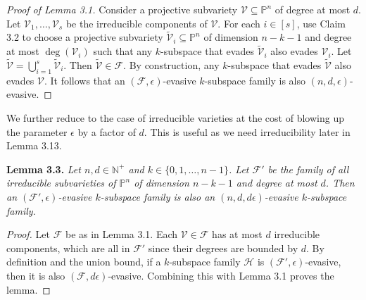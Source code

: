 \documentclass[10pt,a4paper]{article}
\newcommand{\PP}{\mathbb P}
\newenvironment{result}[1]{\par\medskip\noindent\textbf{#1.}\itshape}{\par\medskip}
\begin{document}
\begin{proof}[Proof of Lemma 3.1]
Consider a projective subvariety $\mathcal V\subseteq\PP^n$ of degree at most $d$. Let $\mathcal V_1,\ldots,\mathcal V_s$ be the irreducible components of $\mathcal V$. For each $i\in[s]$, use Claim 3.2 to choose a projective subvariety $\widetilde{\mathcal V}_i\subseteq\PP^n$ of dimension $n-k-1$ and degree at most $\deg(\mathcal V_i)$ such that any $k$-subspace that evades $\widetilde{\mathcal V}_i$ also evades $\mathcal V_i$. Let $\widetilde{\mathcal V}=\bigcup_{i=1}^s\widetilde{\mathcal V}_i$. Then $\widetilde{\mathcal V}\in\mathcal F$. By construction, any $k$-subspace that evades $\widetilde{\mathcal V}$ also evades $\mathcal V$. It follows that an $(\mathcal F,\epsilon)$-evasive $k$-subspace family is also $(n,d,\epsilon)$-evasive.
\end{proof}
We further reduce to the case of irreducible varieties at the cost of blowing up the parameter $\epsilon$ by a factor of $d$. This is useful as we need irreducibility later in Lemma 3.13.
\begin{result}{Lemma 3.3}
Let $n,d\in\mathbb N^+$ and $k\in\{0,1,\ldots,n-1\}$. Let $\mathcal F'$ be the family of all irreducible subvarieties of $\PP^n$ of dimension $n-k-1$ and degree at most $d$. Then an $(\mathcal F',\epsilon)$-evasive $k$-subspace family is also an $(n,d,d\epsilon)$-evasive $k$-subspace family.
\end{result}
\begin{proof}
Let $\mathcal F$ be as in Lemma 3.1. Each $\mathcal V\in\mathcal F$ has at most $d$ irreducible components, which are all in $\mathcal F'$ since their degrees are bounded by $d$. By definition and the union bound, if a $k$-subspace family $\mathcal H$ is $(\mathcal F',\epsilon)$-evasive, then it is also $(\mathcal F,d\epsilon)$-evasive. Combining this with Lemma 3.1 proves the lemma.
\end{proof}
\end{document}
